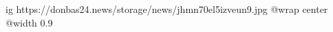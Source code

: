  
 
 
 
 

\ifcmt
  ig https://donbas24.news/storage/news/jhmn70el5izveun9.jpg
  @wrap center
  @width 0.9
\fi
